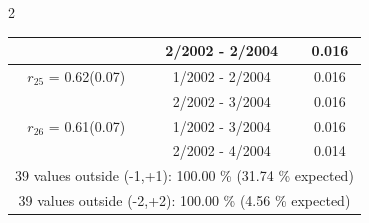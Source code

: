 \begin{multicols}{2}
{\begin{tabular}{ccc}
&        2/2002 -  2/2004 &        0.016  \vspace{-.02in} \\ \hline 
  $r_{25}$ = 0.62(0.07) &       1/2002 -  2/2004 &        0.016   \vspace{-.10in} \\  
&        2/2002 -  3/2004 &        0.016  \vspace{-.02in} \\ \hline 
  $r_{26}$ = 0.61(0.07) &       1/2002 -  3/2004 &        0.016   \vspace{-.10in} \\  
&        2/2002 -  4/2004 &        0.014  \vspace{-.02in} \\ \hline 
\multicolumn{3}{c}{              39 values outside (-1,+1): 100.00  \% (31.74  \% expected)}\vspace{-.10in} \\ 
\multicolumn{3}{c}{              39 values outside (-2,+2): 100.00 \%  (4.56 \% expected) } \\
 \end{tabular} \\ 
 } 
\end{multicols} 
